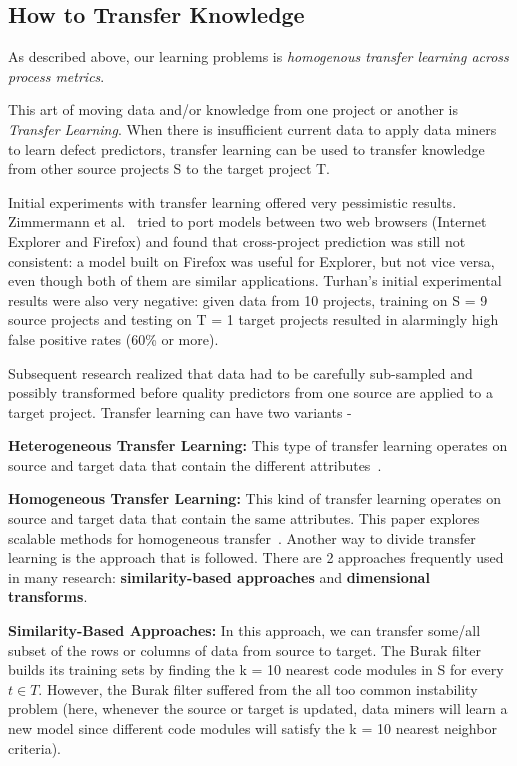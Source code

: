\subsection{ How to  Transfer Knowledge}\label{tion:how1}
As described above, our learning problems is {\em homogenous transfer learning across process metrics}.
 
This     art of moving data and/or knowledge  from one project or another is {\em Transfer Learning}. When there is insufficient current data to apply data miners to learn defect predictors, transfer learning can be used to transfer knowledge from other source projects S to the target project T.

Initial experiments with transfer learning offered very pessimistic results. Zimmermann et al.~\cite{zimmermann2009cross} tried to port models between two web browsers (Internet Explorer and Firefox) and found that cross-project prediction was still not consistent: a model built on Firefox was useful for Explorer, but not vice versa, even though both of them are similar applications. Turhan's initial experimental results were also very negative: given data from 10 projects, training on S = 9 source projects and testing on T = 1 target projects resulted in alarmingly high false positive rates (60\% or more). 

Subsequent research realized that data had to be carefully sub-sampled and possibly transformed before quality predictors from one source are applied to a target project. Transfer learning can have two variants - 

\bi
\item    
 \textbf{Heterogeneous Transfer Learning:} This type of transfer learning operates on source and target data that contain the different attributes~\cite{jing2015heterogeneous,he2014towards,nam2017heterogeneous,cheng2016heterogeneous,yu2017feature}.

\item
\textbf{Homogeneous Transfer Learning:} This kind of transfer learning operates on source and target data that contain the same attributes. This paper explores scalable methods for homogeneous transfer~\cite{ma2012transfer,zimmermann2009cross,turhan2009relative,krishna2018bellwethers}.
\ei
Another way to divide transfer learning is the approach that is followed. There are  2 approaches frequently used in many research: {\bf similarity-based approaches} and {\bf dimensional transforms}.

 \textbf{Similarity-Based Approaches:} In this approach, we can transfer some/all subset of the rows or columns of data from source to target. The Burak filter~\cite{turhan09} builds its training sets by finding the k = 10 nearest code modules in S for every $ t \in T $. However, the Burak filter suffered from the all too common instability problem (here, whenever the source or target is updated, data miners will learn a new model since different code modules will satisfy the k = 10 nearest neighbor criteria). 

